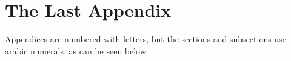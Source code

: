 \chapter{The Last Appendix}
\label{app:n}
Appendices are numbered with letters, but the sections and subsections use
arabic numerals, as can be seen below.


